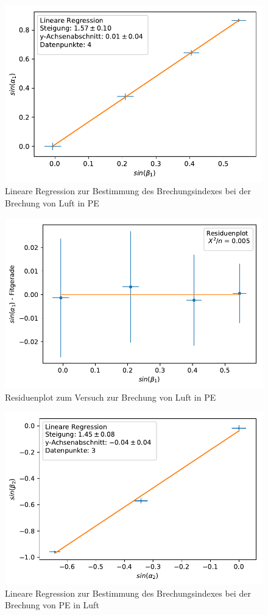 \documentclass[12pt,a4paper]{article}
\begin{document}
\begin{figure}
	\centering
	\includegraphics[scale=1]{Bilder/Brechung_LinReg.pdf}
	\caption{Lineare Regression zur Bestimmung des Brechungsindexes bei der Brechung von Luft in PE}
	\label{Brechung_LinReg}
\end{figure}
\begin{figure}
	\centering
	\includegraphics[scale=1]{Bilder/Brechung_Residuen.pdf}
	\caption{Residuenplot zum Versuch zur Brechung von Luft in PE}
	\label{Brechung_Residuenplot}
\end{figure}
\begin{figure}
	\centering
	\includegraphics[scale=1]{Bilder/Brechung_LinReg2.pdf}
	\caption{Lineare Regression zur Bestimmung des Brechungsindexes bei der Brechung von PE in Luft}
	\label{Brechung2_LinReg}
\end{figure}
\end{document}
